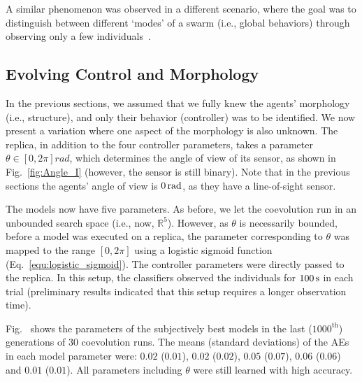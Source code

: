 A similar phenomenon was observed in a different scenario, where the goal was to distinguish between different `modes' of a swarm (i.e., global behaviors) through observing only a few individuals~\cite{Daniel2014}.

\subsection{Evolving Control and Morphology}\label{sec:evolving_control_and_morphology_swarm_simulation}
In the previous sections, we assumed that we fully knew the agents' morphology (i.e., structure), and only their behavior (controller) was to be identified. We now present a variation where one aspect of the morphology is also unknown. The replica, in addition to the four controller parameters, takes a parameter $\theta\in\left[0,2\pi\right]\unit{rad}$, which determines the angle of view of its sensor, as shown in Fig.~\ref{fig:Angle_I} (however, the sensor is still binary). Note that in the previous sections the agents' angle of view is $\unit[0]{rad}$, as they have a line-of-sight sensor.

The models now have five parameters. As before, we let the coevolution run in an unbounded search space (i.e., now, $\mathbb{R}^5$). However, as $\theta$ is necessarily bounded, before a model was executed on a replica, the parameter corresponding to $\theta$ was mapped to the range $[0, 2\pi]$ using a logistic sigmoid function (Eq.~\eqref{equ:logistic_sigmoid}). The controller parameters were directly passed to the replica. In this setup, the classifiers observed the individuals for $\unit[100]{s}$ in each trial (preliminary results indicated that this setup requires a longer observation time). 

Fig.~ shows the parameters of the subjectively best models in the last ($1000^\textrm{th}$) generations of $30$ coevolution runs. The means (standard deviations) of the AEs in each model parameter were: $0.02$ ($0.01$), $0.02$ ($0.02$), $0.05$ ($0.07$), $0.06$ ($0.06$) and $0.01$ ($0.01$). All parameters including $\theta$ were still learned with high accuracy.

